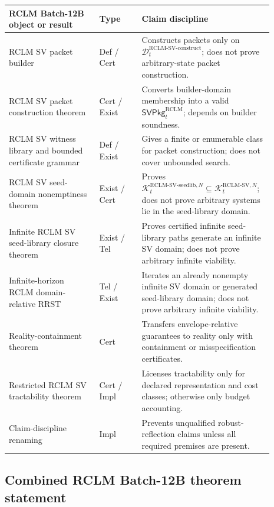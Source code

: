 \documentclass[11pt,a4paper]{article}
\newcommand{\Kcal}{\mathcal K}
\newcommand{\Dcal}{\mathcal D}
\newcommand{\RCLM}{\mathrm{RCLM}}
\begin{document}
\begin{center}
\begin{tabular}{@{}p{0.32\linewidth}p{0.15\linewidth}p{0.42\linewidth}@{}}
\toprule
\textbf{RCLM Batch-12B object or result} & \textbf{Type} & \textbf{Claim discipline}\\
\midrule
RCLM SV packet builder & Def / Cert & Constructs packets only on \(\Dcal_t^{\RCLM\text{-}\mathrm{SV\mbox{-}construct}}\); does not prove arbitrary-state packet construction.\\
RCLM SV packet construction theorem & Cert / Exist & Converts builder-domain membership into a valid \(\mathsf{SVPkg}_t^{\RCLM}\); depends on builder soundness.\\
RCLM SV witness library and bounded certificate grammar & Def / Exist & Gives a finite or enumerable class for packet construction; does not cover unbounded search.\\
RCLM SV seed-domain nonemptiness theorem & Exist / Cert & Proves \(\Kcal_t^{\RCLM\text{-}\mathrm{SV\mbox{-}seedlib},N}\subseteq\Kcal_t^{\RCLM\text{-}\mathrm{SV},N}\); does not prove arbitrary systems lie in the seed-library domain.\\
Infinite RCLM SV seed-library closure theorem & Exist / Tel & Proves certified infinite seed-library paths generate an infinite SV domain; does not prove arbitrary infinite viability.\\
Infinite-horizon RCLM domain-relative RRST & Tel / Exist & Iterates an already nonempty infinite SV domain or generated seed-library domain; does not prove arbitrary infinite viability.\\
Reality-containment theorem & Cert & Transfers envelope-relative guarantees to reality only with containment or misspecification certificates.\\
Restricted RCLM SV tractability theorem & Cert / Impl & Licenses tractability only for declared representation and cost classes; otherwise only budget accounting.\\
Claim-discipline renaming & Impl & Prevents unqualified robust-reflection claims unless all required premises are present.\\
\bottomrule
\end{tabular}
\end{center}

\subsection{Combined RCLM Batch-12B theorem statement}
\end{document}
